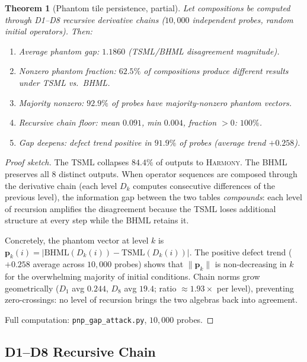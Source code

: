\documentclass[11pt]{article}
\newtheorem{theorem}{Theorem}[section]
\theoremstyle{definition}
\theoremstyle{remark}
\begin{document}
\begin{theorem}[Phantom tile persistence, partial]
\label{thm:pnp-persistence}
Let compositions be computed through D1--D8 recursive derivative chains ($10{,}000$ independent probes, random initial operators).  Then:
\begin{enumerate}
  \item Average phantom gap: $1.1860$ (TSML/BHML disagreement magnitude).
  \item Nonzero phantom fraction: $62.5\%$ of compositions produce different results
        under TSML vs.\ BHML.
  \item Majority nonzero: $92.9\%$ of probes have majority-nonzero phantom vectors.
  \item Recursive chain floor: mean $0.091$, min $0.004$, fraction $> 0$: $100\%$.
  \item Gap deepens: defect trend positive in $91.9\%$ of probes
        (average trend $+0.258$).
\end{enumerate}
\end{theorem}

\begin{proof}[Proof sketch]
The TSML collapses $84.4\%$ of outputs to \textsc{Harmony}.  The BHML preserves all $8$ distinct outputs.  When operator sequences are composed through the derivative chain (each level $D_k$ computes consecutive differences of the previous level), the information gap between the two tables \emph{compounds}: each level of recursion amplifies the disagreement because the TSML loses additional structure at every step while the BHML retains it.

Concretely, the phantom vector at level $k$ is $\mathbf{p}_k(i) = |\text{BHML}(D_k(i)) - \text{TSML}(D_k(i))|$.  The positive defect trend ($+0.258$ average across $10{,}000$ probes) shows that $\|\mathbf{p}_k\|$ is non-decreasing in $k$ for the overwhelming majority of initial conditions.  Chain norms grow geometrically ($D_1$ avg $0.244$, $D_8$ avg $19.4$; ratio $\approx 1.93\times$ per level), preventing zero-crossings: no level of recursion brings the two algebras back into agreement.

Full computation: \texttt{pnp\_gap\_attack.py}, $10{,}000$ probes.
\end{proof}

\subsection{D1--D8 Recursive Chain}
\label{ssec:pnp-chain}
\end{document}
